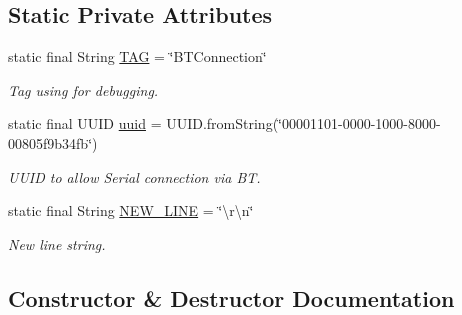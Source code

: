 \subsection*{Static Private Attributes}
\begin{DoxyCompactItemize}
\item 
\mbox{\label{classcom_1_1jack_1_1motorbikestatistics_1_1_b_t_connection_af9455991fec4de29ffc875eae117a761}} 
static final String \hyperlink{classcom_1_1jack_1_1motorbikestatistics_1_1_b_t_connection_af9455991fec4de29ffc875eae117a761}{T\+AG} = \char`\"{}B\+T\+Connection\char`\"{}
\begin{DoxyCompactList}\small\item\em Tag using for debugging. \end{DoxyCompactList}\item 
\mbox{\label{classcom_1_1jack_1_1motorbikestatistics_1_1_b_t_connection_a6551312055376866c73f11721a45e26c}} 
static final U\+U\+ID \hyperlink{classcom_1_1jack_1_1motorbikestatistics_1_1_b_t_connection_a6551312055376866c73f11721a45e26c}{uuid} = U\+U\+I\+D.\+from\+String(\char`\"{}00001101-\/0000-\/1000-\/8000-\/00805f9b34fb\char`\"{})
\begin{DoxyCompactList}\small\item\em U\+U\+ID to allow Serial connection via BT. \end{DoxyCompactList}\item 
\mbox{\label{classcom_1_1jack_1_1motorbikestatistics_1_1_b_t_connection_aacec2fadb24352fd7fdeae731e3ed412}} 
static final String \hyperlink{classcom_1_1jack_1_1motorbikestatistics_1_1_b_t_connection_aacec2fadb24352fd7fdeae731e3ed412}{N\+E\+W\+\_\+\+L\+I\+NE} = \char`\"{}\textbackslash{}r\textbackslash{}n\char`\"{}
\begin{DoxyCompactList}\small\item\em New line string. \end{DoxyCompactList}\end{DoxyCompactItemize}


\subsection{Constructor \& Destructor Documentation}
\mbox{\label{classcom_1_1jack_1_1motorbikestatistics_1_1_b_t_connection_a55a1c23b7bcf9dc097b10b62ce7828ba}} 
